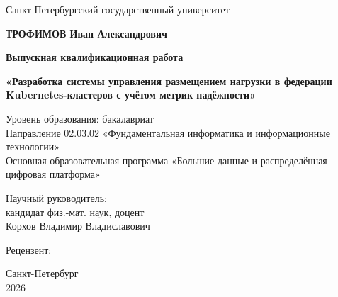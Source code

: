 \begin{titlepage}
\begin{center}
\singlespacing
Санкт-Петербургский государственный университет

\vspace{25mm}
\textbf{ТРОФИМОВ Иван Александрович}

\vspace{8mm}
\textbf{Выпускная квалификационная работа}

\vspace{4mm}
{\large\bfseries «Разработка системы управления размещением нагрузки
в федерации Kubernetes-кластеров с учётом метрик надёжности»\par}

\vspace{12mm}
\begin{flushleft}
Уровень образования: бакалавриат\\
Направление 02.03.02 «Фундаментальная информатика и информационные технологии»\\
Основная образовательная программа  «Большие данные и распределённая цифровая платформа»
\end{flushleft}

\vfill
\begin{flushright}
\begin{minipage}{0.55\textwidth}
Научный руководитель:\\
кандидат физ.-мат. наук, доцент\\
Корхов Владимир Владиславович

\vspace{6mm}
Рецензент:\\
\end{minipage}
\end{flushright}

\vfill
Санкт-Петербург\\
2026
\end{center}
\end{titlepage}
